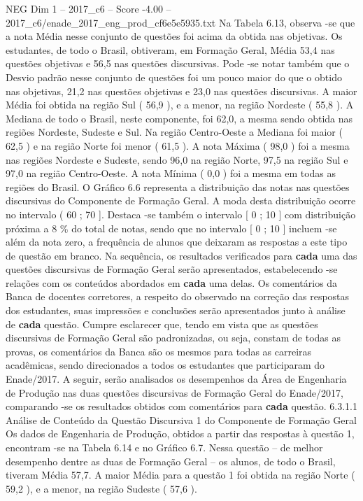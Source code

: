\begin{textsample}{NEG Dim 1 – 2017\_c6 – Score -4.00 – 2017\_c6/enade\_2017\_eng\_prod\_cf6e5e5935.txt}
Na Tabela 6.13, observa -se que a nota Média nesse conjunto de questões foi acima da obtida nas objetivas.
Os estudantes, de todo o Brasil, obtiveram, em Formação Geral, Média 53,4 nas questões objetivas e 56,5 nas questões discursivas.
Pode -se notar também que o Desvio padrão nesse conjunto de questões foi um pouco maior do que o obtido nas objetivas, 21,2 nas questões objetivas e 23,0 nas questões discursivas.
A maior Média foi obtida na região Sul ( 56,9 ), e a menor, na região Nordeste ( 55,8 ).
A Mediana de todo o Brasil, neste componente, foi 62,0, a mesma sendo obtida nas regiões Nordeste, Sudeste e Sul.
Na região Centro-Oeste a Mediana foi maior ( 62,5 ) e na região Norte foi menor ( 61,5 ).
A nota Máxima ( 98,0 ) foi a mesma nas regiões Nordeste e Sudeste, sendo 96,0 na região Norte, 97,5 na região Sul e 97,0 na região Centro-Oeste.
A nota Mínima ( 0,0 ) foi a mesma em todas as regiões do Brasil.
O Gráfico 6.6 representa a distribuição das notas nas questões discursivas do Componente de Formação Geral.
A moda desta distribuição ocorre no intervalo ( 60 ; 70 ].
Destaca -se também o intervalo [ 0 ; 10 ] com distribuição próxima a 8 \% do total de notas, sendo que no intervalo [ 0 ; 10 ] incluem -se além da nota zero, a frequência de alunos que deixaram as respostas a este tipo de questão em branco.
Na sequência, os resultados verificados para \textbf{cada} uma das questões discursivas de Formação Geral serão apresentados, estabelecendo -se relações com os conteúdos abordados em \textbf{cada} uma delas.
Os comentários da Banca de docentes corretores, a respeito do observado na correção das respostas dos estudantes, suas impressões e conclusões serão apresentados junto à análise de \textbf{cada} questão.
Cumpre esclarecer que, tendo em vista que as questões discursivas de Formação Geral são padronizadas, ou seja, constam de todas as provas, os comentários da Banca são os mesmos para todas as carreiras acadêmicas, sendo direcionados a todos os estudantes que participaram do Enade/2017.
A seguir, serão analisados os desempenhos da Área de Engenharia de Produção nas duas questões discursivas de Formação Geral do Enade/2017, comparando -se os resultados obtidos com comentários para \textbf{cada} questão. 6.3.1.1 Análise de Conteúdo da Questão Discursiva 1 do Componente de Formação Geral Os dados de Engenharia de Produção, obtidos a partir das respostas à questão 1, encontram -se na Tabela 6.14 e no Gráfico 6.7.
Nessa questão – de melhor desempenho dentre as duas de Formação Geral – os alunos, de todo o Brasil, tiveram Média 57,7.
A maior Média para a questão 1 foi obtida na região Norte ( 59,2 ), e a menor, na região Sudeste ( 57,6 ).

\end{textsample}
